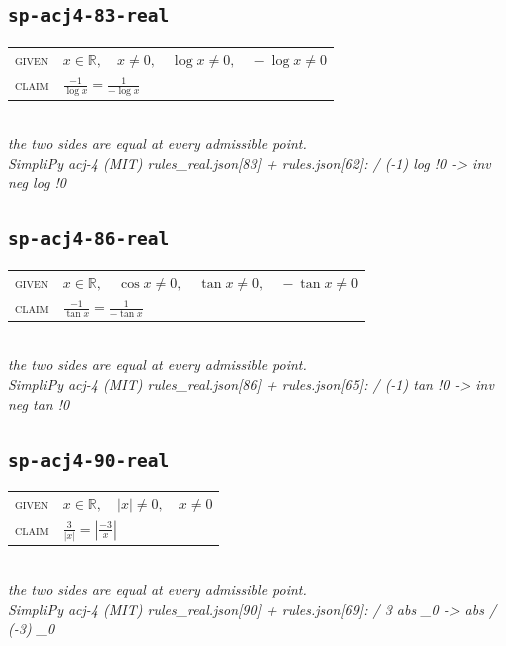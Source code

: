 \documentclass[11pt]{article}
\begin{document}
\subsection*{\texttt{sp-acj4-83-real}}
\begin{tabular}{@{}l@{\quad}l@{}}
\textsc{given} & $x \in \mathbb{R},\quad x \neq 0,\quad \log x \neq 0,\quad -\log x \neq 0$ \\[4pt]
\textsc{claim} & $\displaystyle \frac{-1}{\log x} = \frac{1}{-\log x}$ \\
\end{tabular}\\[2pt]
{\small\emph{the two sides are equal at every admissible point.}}\\
\emph{SimpliPy acj-4 (MIT) rules\_real.json[83] + rules.json[62]: / (-1) log !0  ->  inv neg log !0}\\

\subsection*{\texttt{sp-acj4-86-real}}
\begin{tabular}{@{}l@{\quad}l@{}}
\textsc{given} & $x \in \mathbb{R},\quad \cos x \neq 0,\quad \tan x \neq 0,\quad -\tan x \neq 0$ \\[4pt]
\textsc{claim} & $\displaystyle \frac{-1}{\tan x} = \frac{1}{-\tan x}$ \\
\end{tabular}\\[2pt]
{\small\emph{the two sides are equal at every admissible point.}}\\
\emph{SimpliPy acj-4 (MIT) rules\_real.json[86] + rules.json[65]: / (-1) tan !0  ->  inv neg tan !0}\\

\subsection*{\texttt{sp-acj4-90-real}}
\begin{tabular}{@{}l@{\quad}l@{}}
\textsc{given} & $x \in \mathbb{R},\quad \left|x\right| \neq 0,\quad x \neq 0$ \\[4pt]
\textsc{claim} & $\displaystyle \frac{3}{\left|x\right|} = \left|\frac{-3}{x}\right|$ \\
\end{tabular}\\[2pt]
{\small\emph{the two sides are equal at every admissible point.}}\\
\emph{SimpliPy acj-4 (MIT) rules\_real.json[90] + rules.json[69]: / 3 abs \_0  ->  abs / (-3) \_0}\\
\end{document}
